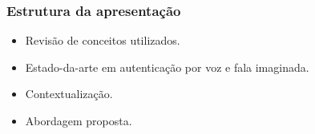 \begin{frame}
	\frametitle{Estrutura da apresentação}
	\begin{itemize}
		\item Revisão de conceitos utilizados.
		\item Estado-da-arte em autenticação por voz e fala imaginada.
		\item Contextualização.
		\item Abordagem proposta.
	\end{itemize}
\end{frame}